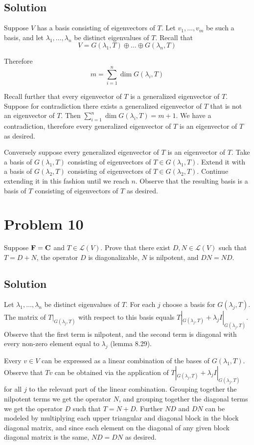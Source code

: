 \documentclass{article}
\begin{document}
\subsection*{Solution}
Suppose $V$ has a basis consisting of eigenvectors of $T$. Let $v_1,\ldots,v_m$ be such a basis, and let $\lambda_1,\ldots,\lambda_n$ be distinct eigenvalues of $T$.  Recall that
\[V=G(\lambda_1, T)\oplus\ldots\oplus G(\lambda_n, T)\]

Therefore
\[m=\sum_{i=1}^n \dim G(\lambda_i, T)\]

Recall further that every eigenvector of $T$ is a generalized eigenvector of $T$. Suppose for contradiction there exists a generalized eigenvector of $T$ that is not an eigenvector of $T$. Then $\sum_{i=1}^n \dim G(\lambda_i, T)=m+1$. We have a contradiction, therefore every generalized eigenvector of $T$ is an eigenvector of $T$ as desired.

\vs

Conversely suppose every generalized eigenvector of $T$ is an eigenvector of $T$. Take a basis of $G(\lambda_1, T)$ consisting of eigenvectors of $T\in G(\lambda_1, T)$. Extend it with a basis of $G(\lambda_2, T)$ consisting of eigenvectors of $T\in G(\lambda_2, T)$. Continue extending it in this fashion until we reach $n$. Observe that the resulting basis is a basis of $T$ consisting of eigenvectors of $T$ as desired.

\section*{Problem 10}
Suppose $\mathbf{F}=\mathbf{C}$ and $T\in\mathcal{L}(V)$. Prove that there exist $D, N\in\mathcal{L}(V)$ such that $T=D+N$, the operator $D$ is diagonalizable, $N$ is nilpotent, and $DN=ND$.

\subsection*{Solution}
Let $\lambda_1,\ldots,\lambda_n$ be distinct eigenvalues of $T$. For each $j$ choose a basis for $G(\lambda_j, T)$. The matrix of $T|_{G(\lambda_j, T)}$ with respect to this basis equals $T|_{G(\lambda_j, T)}+\lambda_j I|_{G(\lambda_j, T)}$. Observe that the first term is nilpotent, and the second term is diagonal with every non-zero element equal to $\lambda_j$ (lemma 8.29). 

\vs

Every $v\in V$ can be expressed as a linear combination of the bases of $G(\lambda_1, T)$. Observe that $Tv$ can be obtained via the application of $T|_{G(\lambda_j, T)}+\lambda_j I|_{G(\lambda_j, T)}$ for all $j$ to the relevant part of the linear combination. Grouping together the nilpotent terms we get the operator $N$, and grouping together the diagonal terms we get the operator $D$ such that $T=N+D$. Further $ND$ and $DN$ can be modeled by multiplying each upper triangular and diagonal block in the block diagonal matrix, and since each element on the diagonal of any given block diagonal matrix is the same, $ND=DN$ as desired.
\end{document}

